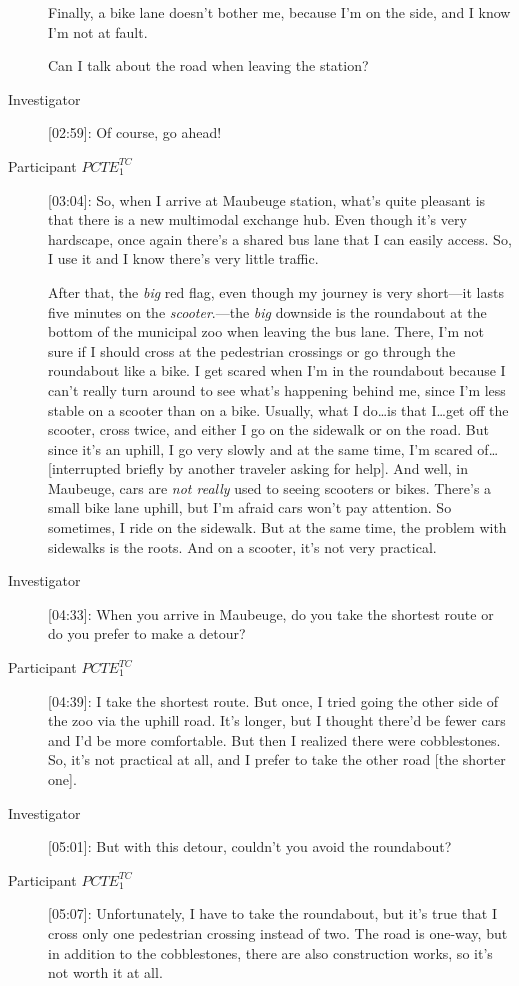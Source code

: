 \begin{description}
    Finally, a bike lane doesn’t bother me, because I’m on the side, and I know I’m not at fault.%
    
    Can I talk about the road when leaving the station?
    \item[Investigator] [02:59]: Of course, go ahead!
    \item[Participant \(PCTE^{TC}_{1}\)] [03:04]: So, when I arrive at Maubeuge station, what’s quite pleasant is that there is a new multimodal exchange hub. Even though it’s very hardscape, once again there’s a shared bus lane that I can easily access. So, I use it and I know there’s very little traffic.%
    
    After that, the \textsl{big} red flag, even though my journey is very short—it lasts five minutes on the \textsl{scooter}.—the \textsl{big} downside is the roundabout at the bottom of the municipal zoo when leaving the bus lane. There, I’m not sure if I should cross at the pedestrian crossings or go through the roundabout like a bike. I get scared when I’m in the roundabout because I can’t really turn around to see what’s happening behind me, since I’m less stable on a scooter than on a bike. Usually, what I do\dots is that I\dots get off the scooter, cross twice, and either I go on the sidewalk or on the road. But since it’s an uphill, I go very slowly and at the same time, I’m scared of\dots [interrupted briefly by another traveler asking for help]. And well, in Maubeuge, cars are \textsl{not really} used to seeing scooters or bikes. There’s a small bike lane uphill, but I’m afraid cars won’t pay attention. So sometimes, I ride on the sidewalk. But at the same time, the problem with sidewalks is the roots. And on a scooter, it’s not very practical.
    \item[Investigator] [04:33]: When you arrive in Maubeuge, do you take the shortest route or do you prefer to make a detour?
    \item[Participant \(PCTE^{TC}_{1}\)] [04:39]: I take the shortest route. But once, I tried going the other side of the zoo via the uphill road. It’s longer, but I thought there’d be fewer cars and I’d be more comfortable. But then I realized there were cobblestones. So, it’s not practical at all, and I prefer to take the other road [the shorter one].
    \item[Investigator] [05:01]: But with this detour, couldn’t you avoid the roundabout?
    \item[Participant \(PCTE^{TC}_{1}\)] [05:07]: Unfortunately, I have to take the roundabout, but it’s true that I cross only one pedestrian crossing instead of two. The road is one-way, but in addition to the cobblestones, there are also construction works, so it’s not worth it at all.

\end{description}
